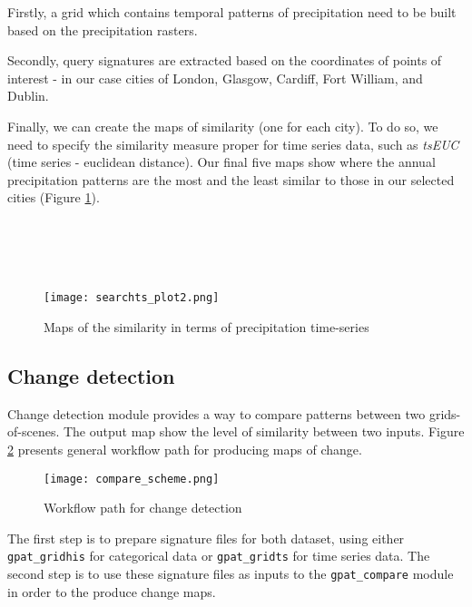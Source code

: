 Firstly, a grid which contains temporal patterns of precipitation need to be built based on the precipitation rasters.

Secondly, query signatures are extracted based on the coordinates of points of interest - in our case cities of London, Glasgow, Cardiff, Fort William, and Dublin. 

Finally, we can create the maps of similarity (one for each city). 
To do so, we need to specify the similarity measure proper for time series data, such as {\it tsEUC} (time series - euclidean distance).
Our final five maps show where the annual precipitation patterns are the most and the least similar to those in our selected cities (Figure \ref{FIG:SEARCHTS2}). \\\\\\\\\\

\begin{figure}[H]
        \begin{center}
	\texttt{[image: searchts\_plot2.png]}
	\caption{Maps of the similarity in terms of precipitation time-series}
	\label{FIG:SEARCHTS2}
        \end{center}
\end{figure}

\FloatBarrier

\subsection{Change detection}

Change detection module provides a way to compare patterns between two grids-of-scenes.
The output map show the level of similarity between two inputs.
Figure \ref{FIG:CHANGE} presents general workflow path for producing maps of change. 

\begin{figure}[H]
	\centering
	\texttt{[image: compare\_scheme.png]}
	\caption{Workflow path for change detection}
	\label{FIG:CHANGE}
\end{figure}

The first step is to prepare signature files for both dataset, using either {\tt gpat\_gridhis} for categorical data or {\tt gpat\_gridts} for time series data.
The second step is to use these signature files as inputs to the {\tt gpat\_compare} module in order to the produce change maps. \\\\


